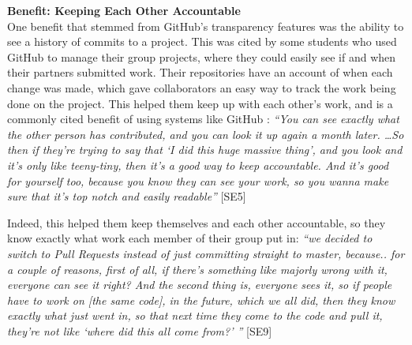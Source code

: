 


\textbf{Benefit: Keeping Each Other Accountable} \\
One benefit that stemmed from GitHub's transparency features was the ability to see a history of commits to a project. This was cited by some students who used GitHub to manage their group projects, where they could easily see if and when their partners submitted work. Their repositories have an account of when each change was made, which gave collaborators an easy way to track the work being done on the project. This helped them keep up with each other's work, and is a commonly cited benefit of using systems like GitHub \cite{dabbish2012social}: \textit{``You can see exactly what the other person has contributed, and you can look it up again a month later. \ldots So then if they're trying to say that `I did this huge massive thing', and you look and it's only like teeny-tiny, then it's a good way to keep accountable. And it's good for yourself too, because you know they can see your work, so you wanna make sure that it's top notch and easily readable''} [SE5]


Indeed, this helped them keep themselves and each other accountable, so they know exactly what work each member of their group put in: \textit{``we decided to switch to Pull Requests instead of just committing straight to master, because.. for a couple of reasons, first of all, if there's something like majorly wrong with it, everyone can see it right? And the second thing is, everyone sees it, so if people have to work on [the same code], in the future, which we all did, then they know exactly what just went in, so that next time they come to the code and pull it, they're not like `where did this all come from?' ''} [SE9]

